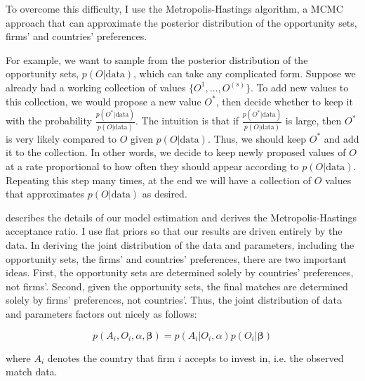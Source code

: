 To overcome this difficulty, I use the Metropolis-Hastings algorithm, a MCMC approach that can approximate the posterior distribution of the opportunity sets, firms' and countries' preferences.

For example, we want to sample from the posterior distribution of the opportunity sets, $p(O|\text{data})$, which can take any complicated form. Suppose we already had a working collection of values $\{O^{1}, \dots, O^{(s)}\}$. To add new values to this collection, we would propose a new value $O^*$, then decide whether to keep it with the probability $\frac{p(O^*|\text{data})}{p(O|\text{data})}$. The intuition is that if $\frac{p(O^*|\text{data})}{p(O|\text{data})}$ is large, then $O^*$ is very likely compared to $O$ given $p(O|\text{data})$. Thus, we should keep $O^*$ and add it to the collection. In other words, we decide to keep newly proposed values of $O$ at a rate proportional to how often they should appear according to $p(O|\text{data})$. Repeating this step many times, at the end we will have a collection of $O$ values that approximates $p(O|\text{data})$ as desired.

 describes the details of our model estimation and derives the Metropolis-Hastings acceptance ratio. I use flat priors so that our results are driven entirely by the data. In deriving the joint distribution of the data and parameters, including the opportunity sets, the firms' and countries' preferences, there are two important ideas. First, the opportunity sets are determined solely by countries' preferences, not firms'. Second, given the opportunity sets, the final matches are determined solely by firms' preferences, not countries'. Thus, the joint distribution of data and parameters factors out nicely as follows:

\[
p(A_i, O_i, \alpha, \bm{\beta}) = p(A_i|O_i, \alpha) p(O_i | \bm{\beta})
\]

where $A_i$ denotes the country that firm $i$ accepts to invest in, i.e. the observed match data.

